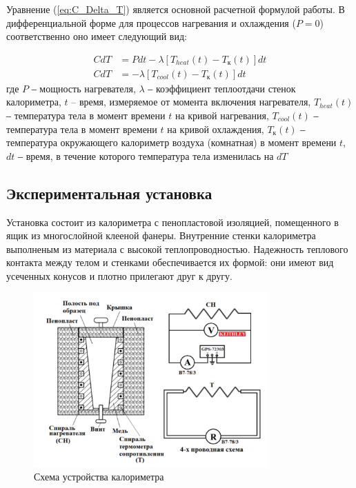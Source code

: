 \documentclass[a4paper, 12pt]{article}
\begin{document}
        Уравнение (\ref{eq:C_Delta_T}) является основной расчетной формулой работы. В дифференциальной форме для процессов нагревания и охлаждения ($P = 0$) соответственно оно имеет следующий вид:

        \begin{align}
            C dT &= P dt - \lambda \left[ T_{heat}(t) - T_к(t) \right] dt \label{eq:CdT} \\
            C dT &= - \lambda \left[ T_{cool}(t) - T_к(t) \right] dt \label{eq:CdT2}
        \end{align}
        где $P$ ‒ мощность нагревателя, $\lambda$ ‒ коэффициент теплоотдачи стенок калориметра, $t$ – время, измеряемое от момента включения нагревателя, $T_{heat}(t)$ ‒ температура тела в момент времени $t$ на кривой нагревания, $T_{cool}(t)$ ‒ температура тела в момент времени $t$ на кривой охлаждения, $T_к(t)$ ‒ температура окружающего калориметр воздуха (комнатная) в момент времени $t$, $dt$ ‒ время, в течение которого температура тела изменилась на $dT$

        \subsection{Экспериментальная установка}

            Установка состоит из калориметра с пенопластовой изоляцией, помещенного в ящик из многослойной клееной фанеры. Внутренние стенки калориметра выполненым из материала с высокой теплопроводностью. Надежность теплового контакта между телом и стенками обеспечивается их формой: они имеют вид усеченных конусов и плотно прилегают друг к другу.

            \begin{figure}[ht]
                \centering
                \includegraphics[width=0.8\textwidth]{img/calorimeter.png}
                \caption{Схема устройства калориметра}
                \label{fig:calorimeter}
            \end{figure}
\end{document}
